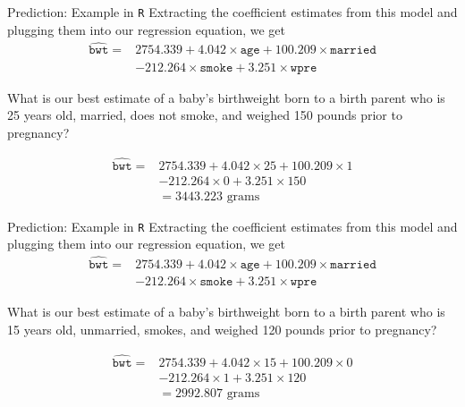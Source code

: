 \documentclass[10pt,t]{beamer}
\begin{document}
\begin{frame}{Prediction: Example in \texttt{R}}
Extracting the coefficient estimates from this model and plugging them into our regression equation, we get
\begin{align*}
\widehat{\texttt{bwt}} = & 2754.339 + 4.042 \times \texttt{age} + 100.209 \times \texttt{married} \\
& - 212.264 \times \texttt{smoke} + 3.251 \times \texttt{wpre} 
\end{align*} \pause

What is our best estimate of a baby's birthweight born to a birth parent who is 25 years old, married, does not smoke, and weighed 150 pounds prior to pregnancy? \pause

\begin{align*}
\widehat{\texttt{bwt}} = & 2754.339 + 4.042 \times 25 + 100.209 \times 1 \\
& - 212.264 \times 0 + 3.251 \times 150  \\
& = 3443.223 \text{ grams}
\end{align*}

\end{frame}

\begin{frame}{Prediction: Example in \texttt{R}}
Extracting the coefficient estimates from this model and plugging them into our regression equation, we get
\begin{align*}
	\widehat{\texttt{bwt}} = & 2754.339 + 4.042 \times \texttt{age} + 100.209 \times \texttt{married} \\
	& - 212.264 \times \texttt{smoke} + 3.251 \times \texttt{wpre} 
\end{align*}

What is our best estimate of a baby's birthweight born to a birth parent who is 15 years old, unmarried, smokes, and weighed 120 pounds prior to pregnancy? \pause

\begin{align*}
\widehat{\texttt{bwt}} = & 2754.339 + 4.042 \times 15 + 100.209 \times 0 \\
& - 212.264 \times 1 + 3.251 \times 120  \\
& = 2992.807 \text{ grams}
\end{align*}

\end{frame}
\end{document}
